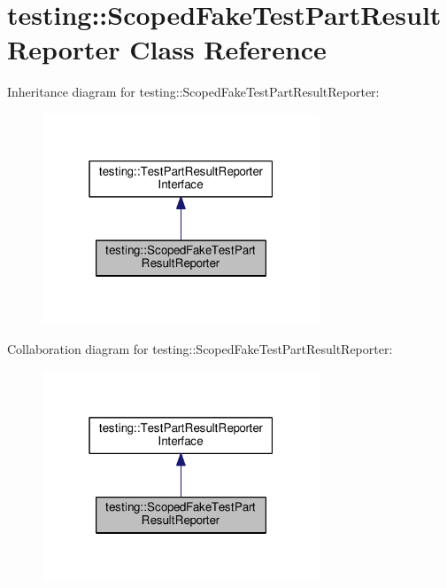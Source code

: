 \hypertarget{classtesting_1_1ScopedFakeTestPartResultReporter}{}\section{testing\+:\+:Scoped\+Fake\+Test\+Part\+Result\+Reporter Class Reference}
\label{classtesting_1_1ScopedFakeTestPartResultReporter}


Inheritance diagram for testing\+:\+:Scoped\+Fake\+Test\+Part\+Result\+Reporter\+:\nopagebreak
\begin{figure}[H]
\begin{center}
\leavevmode
\includegraphics[width=235pt]{classtesting_1_1ScopedFakeTestPartResultReporter__inherit__graph}
\end{center}
\end{figure}


Collaboration diagram for testing\+:\+:Scoped\+Fake\+Test\+Part\+Result\+Reporter\+:\nopagebreak
\begin{figure}[H]
\begin{center}
\leavevmode
\includegraphics[width=235pt]{classtesting_1_1ScopedFakeTestPartResultReporter__coll__graph}
\end{center}
\end{figure}

